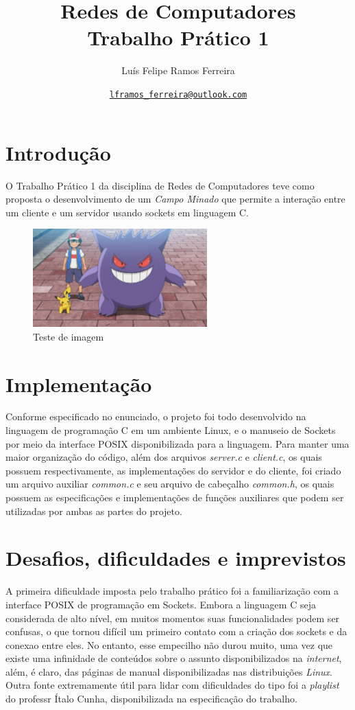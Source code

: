 \documentclass{article}
\title{Redes de Computadores \\ \large Trabalho Prático 1}
\author{Luís Felipe Ramos Ferreira}
\date{\href{mailto:lframos\_ferreira@outlook.com}{\texttt{lframos\_ferreira@outlook.com}}
}
\begin{document}
\maketitle

\section{Introdução}

O Trabalho Prático 1 da disciplina de Redes de Computadores teve como proposta
o desenvolvimento de um \textit{Campo Minado} que permite a interação entre um
cliente e um servidor usando sockets em linguagem C.

\begin{figure}[H]
      \centering
      \includegraphics[width=0.6\textwidth]{images/gengar.png}
      \caption{Teste de imagem}
\end{figure}

\section{Implementação}

Conforme especificado no enunciado, o projeto foi todo desenvolvido na
linguagem de programação C em um ambiente Linux, e o manuseio de Sockets por
meio da interface POSIX
disponibilizada para a linguagem. Para manter uma maior organização do código,
além dos arquivos \textit{server.c} e \textit{client.c}, os quais possuem
respectivamente, as implementações do servidor e do cliente,
foi criado um arquivo auxiliar \textit{common.c} e seu arquivo de cabeçalho
\textit{common.h}, os quais possuem as especificações e implementações de
funções auxiliares que podem ser utilizadas por ambas as partes do projeto.

\section{Desafios, dificuldades e imprevistos}

A primeira dificuldade imposta pelo trabalho prático foi a familiarização com a
interface POSIX de programação em Sockets. Embora a linguagem C seja
considerada de alto nível, em muitos momentos suas funcionalidades podem ser
confusas, o que tornou difícil um primeiro contato com a criação dos sockets e
da conexao entre eles. No entanto, esse empecilho não durou muito, uma vez que
existe uma infinidade de conteúdos sobre o assunto disponibilizados na
\textit{internet}, além, é
claro, das páginas de manual disponibilizadas nas distribuições \textit{Linux}.
Outra fonte extremamente útil para lidar com dificuldades do tipo foi a
\textit{playlist} do professr Ítalo Cunha, disponibilizada na especificação do
trabalho.
\end{document}
